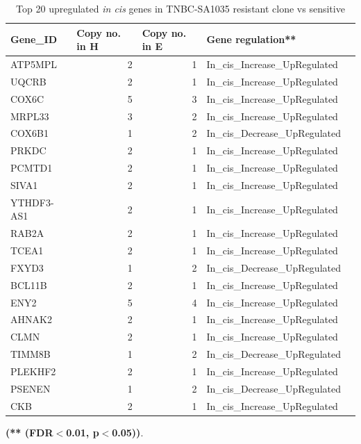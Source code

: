  \begin{table}[htbp]
   \centering
   \caption{Top 20 upregulated \textit{in cis} genes in TNBC-SA1035 resistant clone vs sensitive}
     \begin{tabular}{|l|r|r|l|r}
     \hline
     \textbf{Gene\_ID} & \multicolumn{1}{|l|}{\textbf{Copy no. in H}} & \multicolumn{1}{|l|}{\textbf{Copy no. in E}} & \textbf{Gene regulation**}\\
      \hline
     ATP5MPL & 2 & 1 & In\_cis\_Increase\_UpRegulated \\
     UQCRB & 2 & 1 & In\_cis\_Increase\_UpRegulated   \\
     COX6C & 5 & 3 & In\_cis\_Increase\_UpRegulated  \\
     MRPL33 & 3 & 2 & In\_cis\_Increase\_UpRegulated \\
     COX6B1 & 1 & 2 & In\_cis\_Decrease\_UpRegulated  \\
     PRKDC & 2 & 1 & In\_cis\_Increase\_UpRegulated  \\
     PCMTD1 & 2 & 1 & In\_cis\_Increase\_UpRegulated \\
     SIVA1 & 2 & 1 & In\_cis\_Increase\_UpRegulated \\
     YTHDF3-AS1 & 2 & 1 & In\_cis\_Increase\_UpRegulated \\
     RAB2A & 2 & 1 & In\_cis\_Increase\_UpRegulated \\
     TCEA1 & 2 & 1 & In\_cis\_Increase\_UpRegulated  \\
     FXYD3 & 1 & 2 & In\_cis\_Decrease\_UpRegulated  \\
     BCL11B & 2 & 1 & In\_cis\_Increase\_UpRegulated  \\
     ENY2 & 5 & 4 & In\_cis\_Increase\_UpRegulated  \\
     AHNAK2 & 2 & 1 & In\_cis\_Increase\_UpRegulated  \\
     CLMN & 2 & 1 & In\_cis\_Increase\_UpRegulated  \\
     TIMM8B & 1 & 2 & In\_cis\_Decrease\_UpRegulated  \\
     PLEKHF2 & 2 & 1 & In\_cis\_Increase\_UpRegulated  \\
     PSENEN & 1 & 2 & In\_cis\_Decrease\_UpRegulated  \\
     CKB & 2 & 1 & In\_cis\_Increase\_UpRegulated  \\
     \hline
     \end{tabular}%
   \label{tab:top20SA1035upregulated}%
 
   \small\textbf{(** (FDR$<$0.01, p$<$0.05))}.
 \end{table}%

